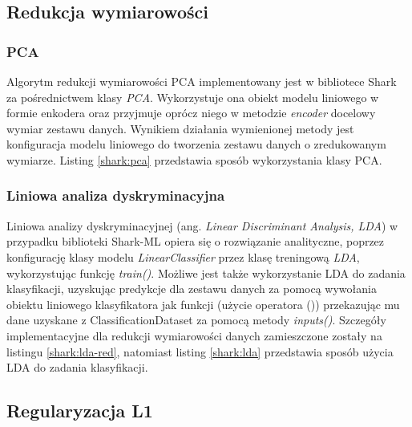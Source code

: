
\subsection{Redukcja wymiarowości}
\subsubsection{PCA}
Algorytm redukcji wymiarowości PCA implementowany jest w bibliotece Shark za pośrednictwem klasy \textit{PCA}. Wykorzystuje ona obiekt modelu liniowego w formie enkodera oraz przyjmuje oprócz niego w metodzie \textit{encoder} docelowy wymiar zestawu danych. Wynikiem działania wymienionej metody jest konfiguracja modelu liniowego do tworzenia zestawu danych o zredukowanym wymiarze. Listing \ref{shark:pca} przedstawia sposób wykorzystania klasy PCA.



\subsubsection{Liniowa analiza dyskryminacyjna}

Liniowa analizy dyskryminacyjnej (ang. \textit{Linear Discriminant Analysis, LDA}) w przypadku biblioteki Shark-ML opiera się o rozwiązanie analityczne, poprzez konfigurację klasy modelu \textit{LinearClassifier} przez klasę treningową \textit{LDA}, wykorzystując funkcję \textit{train()}. Możliwe jest także wykorzystanie LDA do zadania klasyfikacji, uzyskując predykcje dla zestawu danych za pomocą wywołania obiektu liniowego klasyfikatora jak funkcji (użycie operatora ()) przekazując mu dane uzyskane z ClassificationDataset za pomocą metody \textit{inputs()}. Szczegóły implementacyjne dla redukcji wymiarowości danych zamieszczone zostały na listingu \ref{shark:lda-red}, natomiast listing \ref{shark:lda} przedstawia sposób użycia LDA do zadania klasyfikacji.


\subsection{Regularyzacja L1}

